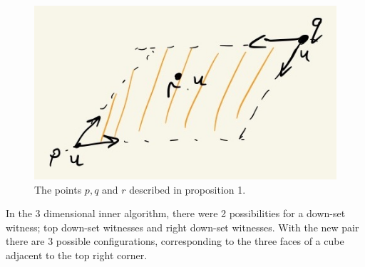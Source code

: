 \documentclass{article}
\begin{document}
  \begin{figure}[htbp]
    \centerline{\includegraphics[scale=.5]{notes-21.jpg}}
    \caption{The points $p, q$ and $r$ described in proposition 1.}
  \end{figure}

  In the 3 dimensional inner algorithm, there were 2 possibilities for a down-set witness; top
  down-set witnesses and right down-set witnesses. With the new pair there are 3 possible configurations,
  corresponding to the three faces of a cube adjacent to the top right corner. 

  
  
\end{document}
